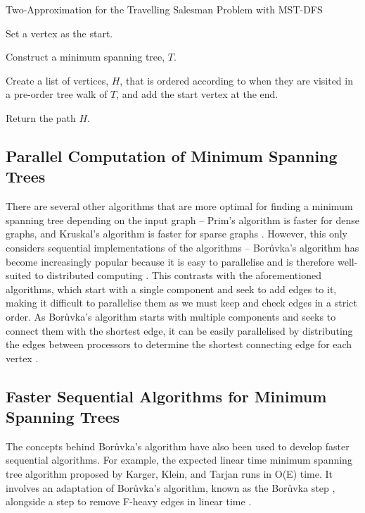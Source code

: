 \documentclass[a4paper, 11pt]{article}
\begin{document}
\begin{algorithm}
    \caption{Two-Approximation for the Travelling Salesman Problem with MST-DFS \cite{andreae1995performance}}
    \nl Set a vertex as the start.
    
    \nl Construct a minimum spanning tree, $T$.
    
    \nl Create a list of vertices, $H$, that is ordered according to when they are visited in a pre-order tree walk of $T$, and add the start vertex at the end.
    
    \nl Return the path $H$.
\end{algorithm}

\subsection{Parallel Computation of Minimum Spanning Trees}
There are several other algorithms that are more optimal for finding a minimum spanning tree depending on the input graph -- Prim's algorithm is faster for dense graphs, and Kruskal's algorithm is faster for sparse graphs \cite{bazlamaccci2001minimum}. However, this only considers sequential implementations of the algorithms -- Borůvka's algorithm has become increasingly popular because it is easy to parallelise and is therefore well-suited to distributed computing \cite{mariano2015generic}. This contrasts with the aforementioned algorithms, which start with a single component and seek to add edges to it, making it difficult to parallelise them as we must keep and check edges in a strict order. As Borůvka's algorithm starts with multiple components and seeks to connect them with the shortest edge, it can be easily parallelised by distributing the edges between processors to determine the shortest connecting edge for each vertex \cite{chung1996parallel}. 

\subsection{Faster Sequential Algorithms for Minimum Spanning Trees}
The concepts behind Borůvka's algorithm have also been used to develop faster sequential algorithms. For example, the expected linear time minimum spanning tree algorithm proposed by Karger, Klein, and Tarjan runs in O(E) time. It involves an adaptation of Borůvka's algorithm, known as the Borůvka step \cite{dixon1992verification, king1995simpler}, alongside a step to remove F-heavy edges in linear time \cite{karger1995randomized}.

\newpage


\end{document}
